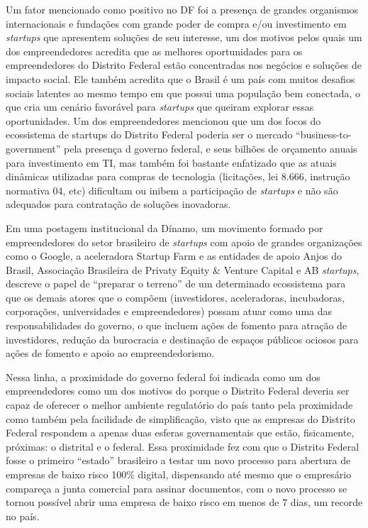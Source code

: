 Um fator mencionado como positivo no DF foi a presença de grandes organismos internacionais e fundações com grande poder de compra e/ou investimento em \textit{startups} que apresentem soluções de seu interesse, um dos motivos pelos quais um dos empreendedores acredita que as melhores oportunidades para os empreendedores do Distrito Federal estão concentradas nos negócios e soluções de impacto social. Ele também acredita que o Brasil é um país com muitos desafios sociais latentes ao mesmo tempo em que possui uma população bem conectada, o que cria um cenário favorável para \textit{startups} que queiram explorar essas oportunidades. Um dos empreendedores mencionou que um dos focos do ecossistema de startups do Distrito Federal poderia ser o mercado ``business-to-government'' pela presença d governo federal, e seus bilhões de orçamento anuais para investimento em TI, mas também foi bastante enfatizado que as atuais dinâmicas utilizadas para compras de tecnologia (licitações, lei 8.666, instrução normativa 04, etc) dificultam ou inibem a participação de \textit{startups} e não são adequados para contratação de soluções inovadoras. 

Em uma postagem institucional da Dínamo, um movimento formado por empreendedores do setor brasileiro de \textit{startups} com apoio de grandes organizações como o Google, a aceleradora Startup Farm e as entidades de apoio Anjos do Brasil, Associação Brasileira de Privaty Equity \& Venture Capital e AB \textit{startups},  descreve o papel de ``preparar o terreno'' de um determinado ecossistema para que os demais atores que o compõem (investidores, aceleradoras, incubadoras, corporações, universidades e empreendedores) possam atuar como uma das responsabilidades do governo, o que incluem ações de fomento para atração de investidores, redução da burocracia e destinação de espaços públicos ociosos para ações de fomento e apoio ao empreendedorismo.

Nessa linha, a proximidade do governo federal foi indicada como um dos empreendedores como um dos motivos do porque o Distrito Federal deveria ser capaz de oferecer o melhor ambiente regulatório do país tanto pela proximidade como também pela facilidade de simplificação, visto que as empresas do Distrito Federal respondem a apenas duas esferas governamentais que estão, fisicamente, próximas: o  distrital e o federal. Essa proximidade fez com que o Distrito Federal fosse o primeiro ``estado'' brasileiro a testar um novo processo para abertura de empresas de baixo risco 100\% digital, dispensando até mesmo que o empresário compareça a junta comercial para assinar documentos, com o novo processo se tornou possível abrir uma empresa de baixo risco em menos de 7 dias, um recorde no país.


